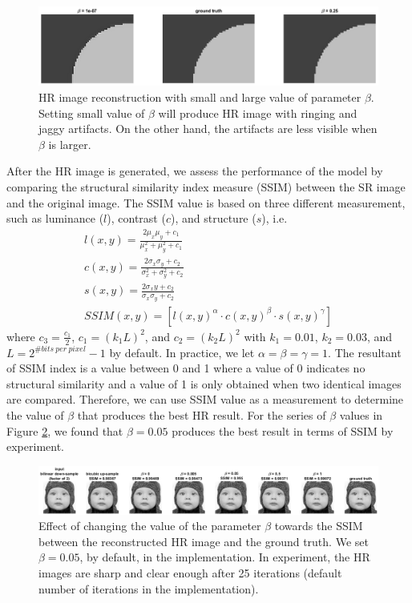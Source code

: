 \documentclass[a4paper,11pt]{article}
\begin{document}
\begin{figure}[H]
	\centering
	\includegraphics[width=1\textwidth]{large small beta.png}
	\caption{HR image reconstruction with small and large value of parameter $\beta$. Setting small value of $\beta$ will produce HR image with ringing and jaggy artifacts. On the other hand, the artifacts are less visible when $\beta$ is larger.}
	\label{fig:beta2}
\end{figure}
 
After the HR image is generated, we assess the performance of the model by comparing the structural similarity index measure (SSIM) between the SR image and the original image. The SSIM value is based on three different measurement, such as luminance ($l$), contrast ($c$), and structure ($s$), i.e.
\begin{gather*}
	l(x,y) = \frac{2 \mu_x \mu_y + c_1}{\mu_x^2 + \mu_y^2 + c_1}\\
	c(x,y) = \frac{2 \sigma_x \sigma_y + c_2}{\sigma_x^2 + \sigma_y^2 + c_2}\\
	s(x,y) = \frac{2 \sigma_xy + c_2}{\sigma_x \sigma_y + c_2}\\
	SSIM(x,y) = [l(x,y)^\alpha \cdot c(x,y)^\beta \cdot s(x,y)^\gamma]
\end{gather*}
where $c_3 = \frac{c_1}{2}$, $c_1=(k_1L)^2$, and $c_2=(k_2L)^2$ with $k_1=0.01$, $k_2=0.03$, and $L=2^{\#bits\ per\ pixel}-1$ by default. In practice, we let $\alpha = \beta = \gamma = 1$. The resultant of SSIM index is a value between 0 and 1 where a value of 0 indicates no structural similarity and a value of 1 is only obtained when two identical images are compared. Therefore, we can use SSIM value as a measurement to determine the value of $\beta$ that produces the best HR result. For the series of $\beta$ values in Figure \ref{fig:beta}, we found that $\beta = 0.05$ produces the best result in terms of SSIM by experiment.

\begin{figure}[H]
	\centering
	\includegraphics[width=1\textwidth]{beta.png}
	\caption{Effect of changing the value of the parameter $\beta$ towards the SSIM between the reconstructed HR image and the ground truth. We set $\beta = 0.05$, by default, in the implementation. In experiment, the HR images are sharp and clear enough after 25 iterations (default number of iterations in the implementation).}
	\label{fig:beta}
\end{figure}
\end{document}
